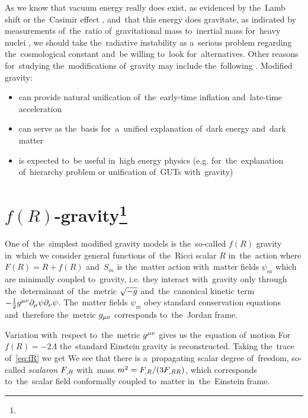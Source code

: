 As we know that vacuum energy really does exist, as evidenced by the~Lamb shift \parencite{2020Physi...2..105M} or the~Casimir effect \parencite{2006BrJPh..36.1137F}, and~that this energy does gravitate, as indicated by measurements of~the~ratio of~gravitational mass to~inertial mass for~heavy nuclei \parencite{Braginskii:1971tn}, we should take the~radiative instability as a~serious problem regarding the~cosmological constant and~be willing to~look for~alternatives. Other reasons for~studying the~modifications of~gravity may include the~following \parencite{2006hep.th....1213N}. Modified gravity:
\begin{itemize}
	\item can provide natural unification of~the~early-time inflation and~late-time acceleration
	\item can serve as the~basis for~a~unified explanation of~dark energy and~dark matter
	\item is expected to~be useful in~high energy physics (e.g. for~the~explanation of~hierarchy problem or unification of~GUTs with~gravity)
\end{itemize} 
\DIFdelbegin %
\DIFdelend \DIFaddbegin \section[$f(R)$-gravity]{\DIFaddend $f(R)$-gravity\DIFaddbegin \footnote{}\DIFaddend }
\DIFaddbegin \label{sec:fR}
\DIFaddend One of~the~simplest modified gravity models is the~so-called $f(R)$ gravity in~which we consider general functions of~the~Ricci scalar $R$ in~the~action
where $F(R)=R+f(R)$ and~$S_m$ is the~matter action with~matter fields $\psi_m$ which are minimally coupled to~gravity, i.e. they interact with~gravity only through the~determinant of~the~metric $\sqrt{-g}$ and~the~canonical kinetic term $-\frac12g^{\mu\nu}\partial_\mu\psi\partial_\nu\psi$. The~matter fields $\psi_m$ obey standard conservation equations and~therefore the~metric $g_{\mu\nu}$ corresponds to~the~Jordan frame.

Variation with~respect to~the~metric $g^{\mu\nu}$ gives us the~equation of~motion
For~$f(R)=-2\Lambda$ the~standard Einstein gravity is reconstructed. Taking the~trace of~\eqref{eq:fR} we get
We see that there is a~propagating scalar degree of~freedom, so-called \textit{scalaron} $F_{,R}$ with~mass $m^2=F_{,R}/(3F_{,RR})$, which corresponds to~the~scalar field conformally coupled to~matter in~the~Einstein frame.

